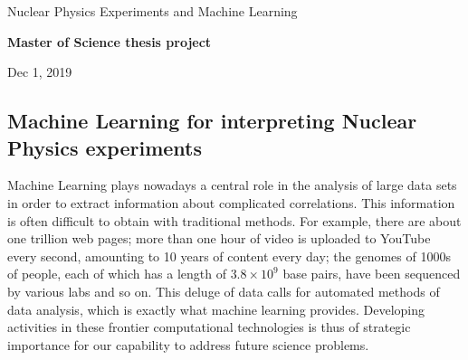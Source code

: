 \documentclass[%
oneside,                 %
final,                   %
10pt]{article}
\begin{document}

\newcommand{\exercisesection}[1]{\subsection*{#1}}






\thispagestyle{empty}

\begin{center}
{\LARGE\bf
\begin{spacing}{1.25}
Nuclear Physics Experiments and  Machine Learning
\end{spacing}
}
\end{center}


\begin{center}
{\bf Master of Science thesis project${}^{}$} \\ [0mm]
\end{center}

\begin{center}
\end{center}
    

\begin{center}
Dec 1, 2019
\end{center}

\vspace{1cm}


\subsection*{Machine Learning for interpreting Nuclear Physics experiments}


Machine Learning plays nowadays a central role
in the analysis of large data sets in order to extract information
about complicated correlations. This information is often difficult to
obtain with traditional methods. For example, there are about one
trillion web pages; more than one hour of video is uploaded to YouTube
every second, amounting to 10 years of content every day; the genomes
of 1000s of people, each of which has a length of $3.8\times 10^9$
base pairs, have been sequenced by various labs and so on. This deluge
of data calls for automated methods of data analysis, which is exactly
what machine learning provides.  Developing activities in these
frontier computational technologies is thus of strategic importance
for our capability to address future science problems.
\end{document}
